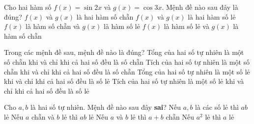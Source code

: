 \begin{ex}%
	Cho hai hàm số  $f(x)=\sin2x$ và $g(x)=\cos3x$. Mệnh đề nào sau đây là đúng?
	\choice 
		 {$f(x)$ và $g(x)$ là hai hàm số chẵn}
		{$f(x)$ và  $g(x)$ là hai hàm số lẻ}
		{$f(x)$ là  hàm số chẵn và $g(x)$ là hàm số lẻ}
		{\True $f(x)$ là hàm số lẻ  và $g(x)$ là hàm số chẵn}
\end{ex}

\begin{ex}%
	Trong các  mệnh đề sau, mệnh đề nào là đúng?
	 \choice
		 {Tổng của hai số tự nhiên là một số chẵn khi và chỉ khi cả hai số đều là số chẵn}
		 {Tích của hai số tự nhiên là một số chẵn khi và chỉ khi cả hai số đều là số chẵn}
		{Tổng của hai số tự nhiên là một số  lẻ khi và chỉ khi cả hai số đều là số lẻ}
		{\True Tích của hai số tự nhiên là một số  lẻ khi và chỉ khi cả hai số đều là số lẻ}
\end{ex}

\begin{ex}%
	Cho $a,b$ là hai  số tự nhiên. Mệnh đề nào sau đây \textbf{sai}?
	 \choice
		{Nếu $a,  b$ là các số lẻ thì $ab$ lẻ}
		{\True  Nếu $a$ chẵn và $b$ lẻ thì $ab$ lẻ}
		 {Nếu $a$ và $b$ lẻ thì $a+b$ chẵn}
		{Nếu  $a^2$ lẻ thì $a$ lẻ}
\end{ex}

